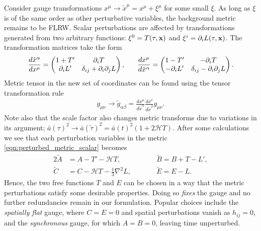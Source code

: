 Consider gauge transformations $x^\mu \rightarrow \tilde{x}^\mu = x^\mu + \xi^\mu$ for some small $\xi$. As long as $\xi$ is of the same order as other perturbative variables, the background metric remains to be FLRW. Scalar perturbations are affected by transformations generated from two arbitrary functions: $\xi^0 = T(\tau,\mathbf{x})$ and $\xi^i = \partial_i L(\tau,\mathbf{x})$. The transformation matrices take the form
\begin{align}
	\frac{d\tilde{x}^\alpha}{dx^\mu} = \begin{pmatrix}
		1 + T' & \partial_i T \\ \partial_i L' & \delta_{ij} + \partial_i \partial_j L
	\end{pmatrix},
	\hspace{0.05\linewidth}
	\frac{dx^\mu}{d\tilde{x}^\alpha} = \begin{pmatrix}
		1 - T' & -\partial_i T \\ -\partial_i L' & \delta_{ij} - \partial_i \partial_j L
	\end{pmatrix}.
\end{align}
Metric tensor in the new set of coordinates can be found using the tensor transformation rule
\begin{align}
	g_{\mu\nu} \rightarrow \tilde{g}_{\alpha\beta} = \frac{dx^\mu}{d\tilde{x}^\alpha} \frac{dx^\nu}{d\tilde{x}^\beta} g_{\mu\nu}.
\end{align}
Note also that the scale factor also changes 
metric transforms due to variations in its argument;  $\bar{a}(\tau)^2 \rightarrow \bar{a}(\tilde{\tau})^2 = \bar{a}(t)^2 (1 + 2 \mathcal{H} T)$. After some calculations we see that each perturbation variables in the metric \eqref{eqn:perturbed_metric_scalar} becomes
\begin{alignat}{2}
	\tilde{A} &= A - T' - \mathcal{H}T, \qquad &&\tilde{B} = B + T - L', \label{eqn:gauge_transform_perturbations_1}\\
	\tilde{C} &= C - \mathcal{H}T - \frac{1}{3}\nabla^2 L, \qquad &&\tilde{E} = E - L. \label{eqn:gauge_transform_perturbations_2}
\end{alignat}
Hence, the two free functions $T$ and $E$ can be chosen in a way that the metric perturbations satisfy some desirable properties. Doing so \textit{fixes} the gauge and no further redundancies remain in our formulation. Popular choices include the \textit{spatially flat} gauge, where $C=E=0$ and spatial perturbations vanish as $h_{ij}=0$, and the \textit{synchronous} gauge, for which $A=B=0$, leaving time unperturbed.

